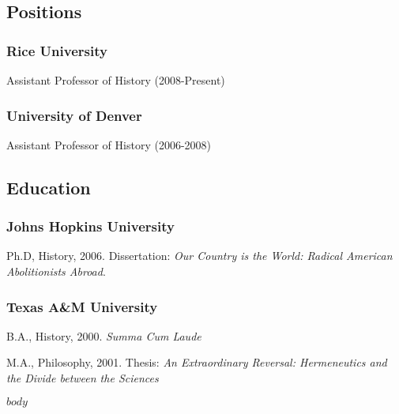 \documentclass[11pt]{article}
\begin{document}
\bigskip\bigskip
{}
\reversemarginpar
\bigskip\medskip  

\subsection{Positions}

\subsubsection{Rice University}
\ind Assistant Professor of History (2008-Present)
\medskip
\subsubsection{University of Denver}
\ind Assistant Professor of History (2006-2008)

\medskip

\subsection{Education}

\subsubsection{Johns Hopkins University}

\ind Ph.D, History, 2006. Dissertation: \emph{Our Country is the World: Radical American Abolitionists Abroad}. %
\medskip
\subsubsection{Texas A\&M University}

\ind B.A., History, 2000. \emph{Summa Cum Laude} 

\ind M.A., Philosophy, 2001. Thesis: \emph{An Extraordinary Reversal: Hermeneutics and the Divide between the Sciences} %

\medskip

$body$
\end{document}
